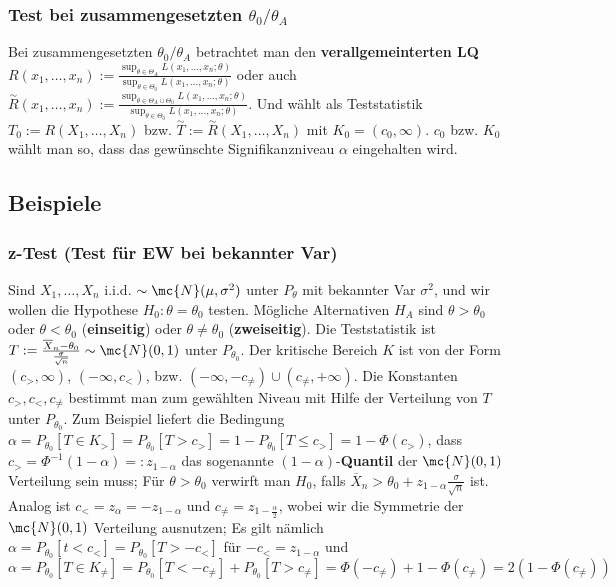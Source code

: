 \subsubsection{Test bei zusammengesetzten $\theta_0/\theta_A$}
Bei zusammengesetzten $\theta_0/\theta_A$ betrachtet man den \textbf{verallgemeinterten LQ} $R(x_1, \dots, x_n) := \frac{\sup_{\theta \in \Theta_A} L(x_1, \dots, x_n; \theta)}{\sup_{\theta \in \Theta_0}L(x_1, \dots, x_n; \theta)}$ oder auch $\overset{\sim}{R}(x_1, \dots, x_n) := \frac{\sup_{\theta \in \Theta_A \cup \Theta_0} L(x_1, \dots, x_n; \theta)}{\sup_{\theta \in \Theta_0}L(x_1, \dots, x_n; \theta)}$. Und wählt als Teststatistik $T_0 := R(X_1, \dots, X_n)$ bzw. $\overset{\sim}{T} := \overset{\sim}{R}(X_1, \dots, X_n)$ mit $K_0 = (c_0, \infty)$. $c_0$ bzw. $K_0$ wählt man so, dass das gewünschte Signifikanzniveau $\alpha$ eingehalten wird.

\subsection{Beispiele}
\subsubsection{z-Test (Test für EW bei bekannter Var)}
Sind $X_1, \dots, X_n$ i.i.d. $\sim \mc{N}(\mu, \sigma^2)$ unter $P_\theta$ mit bekannter Var $\sigma^2$, und wir wollen die Hypothese $H_0: \theta = \theta_0$ testen. Mögliche Alternativen $H_A$ sind $\theta > \theta_0$ oder $\theta < \theta_0$ (\textbf{einseitig}) oder $\theta \neq \theta_0$ (\textbf{zweiseitig}). Die Teststatistik ist $T := \frac{\overline{X}_n - \theta_0}{\frac{\sigma}{\sqrt{n}}} \sim \mc{N}(0, 1)$ unter $P_{\theta_0}$. Der kritische Bereich $K$ ist von der Form $(c_>, \infty)$, $(-\infty, c_<)$, bzw. $(-\infty, -c_{\neq}) \cup (c_{\neq}, + \infty)$. Die Konstanten $c_>, c_<, c_{\neq}$ bestimmt man zum gewählten Niveau mit Hilfe der Verteilung von $T$ unter $P_{\theta_0}$. Zum Beispiel liefert die Bedingung $\alpha = P_{\theta_0}[T \in K_>] = P_{\theta_0}[T > c_>] = 1 - P_{\theta_0}[T \le c_>] = 1 - \Phi(c_>)$, dass $c_> = \Phi^{-1}(1 - \alpha) =: z_{1 - \alpha}$ das sogenannte $(1 - \alpha)$-\textbf{Quantil} der $\mc{N}(0, 1)$ Verteilung sein muss; Für $\theta > \theta_0$ verwirft man $H_0$, falls $\overline{X}_n > \theta_0 + z_{1 - \alpha} \frac{\sigma}{\sqrt{n}}$ ist. Analog ist $c_< = z_\alpha = -z_{1 - \alpha}$ und $c_{\neq} = z_{1 - \frac{\alpha}{2}}$, wobei wir die Symmetrie der $\mc{N}(0, 1)$ Verteilung ausnutzen; Es gilt nämlich $\alpha = P_{\theta_0}[t < c_<] = P_{\theta_0}[T > -c_<]$ für $-c_< = z_{1 - \alpha}$ und $\alpha = P_{\theta_0}[T \in K_{\neq}] = P_{\theta_0} [T < -c_{\neq}] + P_{\theta_0}[T > c_{\neq}] = \Phi(-c_{\neq}) + 1 - \Phi(c_{\neq}) = 2(1 - \Phi(c_{\neq}))$

